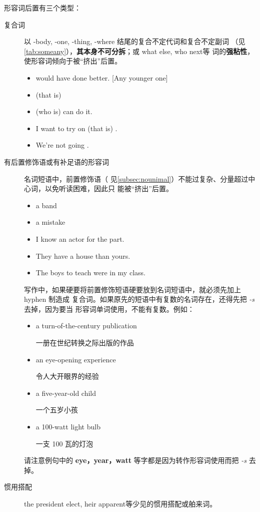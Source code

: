 形容词后置有三个类型：
\begin{description}
\item[复合词] 以 -body, -one, -thing, -where 结尾的复合不定代词和复合不定副词
  （见\cref{tab:someany}），\textbf{其本身不可分拆}；或 what else, who next等
  词的\textbf{强粘性}，使形容词倾向于被“挤出”后置。
  \begin{itemize}
  \item {}  would have done better. [Any younger one]

  \item {} (that is) 
  \item {} (who is)  can do it.
  \item I want to try on  (that is) .
  \item We're not going  .
  \end{itemize}

\item[有后置修饰语或有补足语的形容词] 名词短语中，前置修饰语（
  见\cref{subsec:nounimal}）不能过复杂、分量超过中心词，以免听读困难，因此只
  能被“挤出”后置。
  \begin{itemize}
  \item a band 

  \item a mistake 

  \item I know an actor  for the part.
  \item They have a house  than yours.
  \item The boys  to teach were in my class.
  \end{itemize}

  写作中，如果硬要将前置修饰短语硬要放到名词短语中，就必须先加上hyphen 制造成
  复合词。如果原先的短语中有复数的名词存在，还得先把 \emph{-s} 去掉，因为要当
  形容词单词使用，不能有复数。例如：

  \begin{itemize}
  \item  a turn-of-the-century publication

    一册在世纪转换之际出版的作品
  \item  an eye-opening experience

    令人大开眼界的经验
  \item  a five-year-old child

    一个五岁小孩
  \item  a 100-watt light bulb

    一支 100 瓦的灯泡
  \end{itemize}

  请注意例句中的 \textbf{eye，year，watt} 等字都是因为转作形容词使用而把 \emph{-s} 去掉。

\item[惯用搭配] the president elect, heir apparent等少见的惯用搭配或舶来词。
\end{description}

